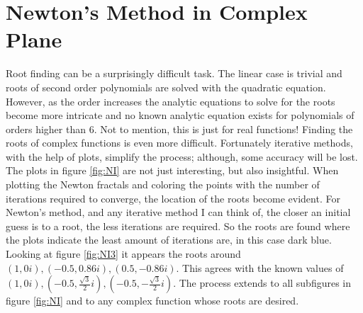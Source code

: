 \documentclass[letterpaper,11pt]{article}
\begin{document}
\section{Newton's Method in Complex Plane}
Root finding can be a surprisingly difficult task. The linear case is trivial and roots of second order polynomials are solved with the quadratic equation. However, as the order increases the analytic equations to solve for the roots become more intricate and no known analytic equation exists for polynomials of orders higher than 6. Not to mention, this is just for real functions! Finding the roots of complex functions is even more difficult. Fortunately iterative methods, with the help of plots, simplify the process; although, some accuracy will be lost. The plots in figure \ref{fig:NI} are not just interesting, but also insightful. When plotting the Newton fractals and coloring the points with the number of iterations required to converge, the location of the roots become evident. For Newton's method, and any iterative method I can think of, the closer an initial guess is to a root, the less iterations are required. So the roots are found where the plots indicate the least amount of iterations are, in this case dark blue. Looking at figure \ref{fig:NI3} it appears the roots around $(1,0i), (-0.5,0.86i), (0.5,-0.86i)$. This agrees with the known values of $(1,0i), (-0.5, \frac{\sqrt{3}}{2}i), (-0.5, -\frac{\sqrt{3}}{2}i)$. The process extends to all subfigures in figure \ref{fig:NI} and to any complex function whose roots are desired.
\end{document}
